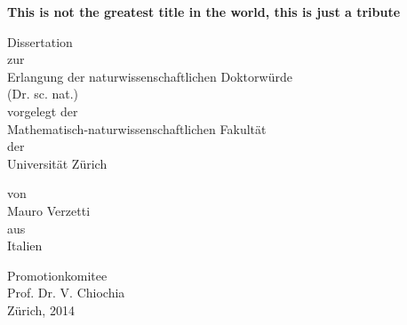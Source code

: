     \begin{titlepage}
      \setlength{\baselineskip}{8mm}
      \vspace{1cm}
     \begin{center}
       {\def\\{\linebreak}
        \huge\bf This is not the greatest title in the world, this is just a tribute}
      \end{center}
      \vspace{1cm}
      \begin{center}
        \Large Dissertation  \\%
        \vspace{0.4cm}
        \large zur  \\
        \vspace{0.4cm}
        \Large Erlangung der naturwissenschaftlichen Doktorw\"urde \\ %
        \Large (Dr. sc. nat.) \\
        \vspace{0.4cm}
        \large vorgelegt der \\
        \vspace{0.4cm} 
        \Large Mathematisch-naturwissenschaftlichen Fakult\"at \\
        \vspace{0.4cm}
        \large der \\
        \vspace{0.4cm}
        \Large Universit\"at Z\"urich \\
      \end{center}
      \vspace{0.2cm}
    \begin{center}
      \large von \\
      \LARGE Mauro Verzetti \\
       \vspace{0.2cm}
        \large aus \\
        \vspace{0.2cm}
        \Large Italien \\
      \end{center}
      \begin{center}
        \large Promotionkomitee \\%
        \vspace{0.2cm}
        \Large Prof. Dr. V. Chiochia \\%
       \vfill
       \large Z\"urich, 2014       
      \end{center}
      \vspace{1.0cm}
\cleardoublepage
    \end{titlepage}

\blankpage